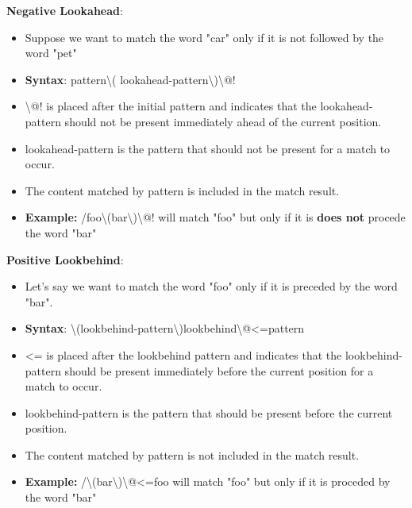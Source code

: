 \documentclass{report}
\begin{document}
    \bigbreak \noindent 
    \textbf{Negative Lookahead}:
    \begin{itemize}
        \item Suppose we want to match the word "car" only if it is not followed by the word "pet"
        \item \textbf{Syntax}: pattern\textbackslash( lookahead-pattern\textbackslash)\textbackslash @!
        \item \textbackslash @! is placed after the initial pattern and indicates that the lookahead-pattern should not be present immediately ahead of the current position.
        \item lookahead-pattern is the pattern that should not be present for a match to occur.
        \item The content matched by pattern is included in the match result.
        \item \textbf{Example:} /foo\textbackslash(bar\textbackslash)\textbackslash @! will match "foo" but only if it is \textbf{does not} procede the word "bar"
    \end{itemize}

    \bigbreak \noindent 
    \textbf{Positive Lookbehind}:
    \begin{itemize}
        \item Let's say we want to match the word "foo" only if it is preceded by the word "bar".
        \item \textbf{Syntax}: \textbackslash(lookbehind-pattern\textbackslash)lookbehind\textbackslash @<=pattern
        \item \@<= is placed after the lookbehind pattern and indicates that the lookbehind-pattern should be present immediately before the current position for a match to occur.
        \item lookbehind-pattern is the pattern that should be present before the current position.
        \item The content matched by pattern is not included in the match result.
        \item \textbf{Example:} /\textbackslash(bar\textbackslash)\textbackslash @<=foo will match "foo" but only if it is proceded by the word "bar"
    \end{itemize}
\end{document}
